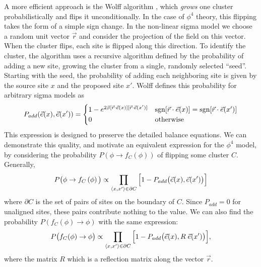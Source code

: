 A more efficient approach is the Wolff algorithm \cite{wolff1989}, which \textit{grows} one cluster probabilistically and flips it unconditionally. In the case of $\phi^4$ theory, this flipping takes the form of a simple sign change. In the non-linear sigma model we choose a random unit vector $\vec r$ and consider the projection of the field on this vector. When the cluster flips, each site is flipped along this direction. To identify the cluster, the algorithm uses a recursive algorithm defined by the probability of adding a new site, growing the cluster from a single, randomly selected ``seed''. Starting with the seed, the probability of adding each neighboring site is given by the source site $x$ and the proposed site $x'$. Wolff defines this probability for arbitrary sigma models as 
\begin{equation}
    \label{eq:phi4 wolff padd}
    P_{add}(\vec e(x),\vec e(x')) = \begin{cases} 
        1 - e^{2\beta [\vec{r} \cdot \vec e(x)][\vec{r} \cdot \vec e(x')]} & \mathrm{sgn}[\vec{r}\cdot\vec e(x)]=\mathrm{sgn}[\vec{r}\cdot\vec e(x')]\\
        0 & \mathrm{otherwise} \\
   \end{cases}
\end{equation}
This expression is designed to preserve the detailed balance equations. We can demonstrate this quality, and motivate an equivalent expression for the $\phi^4$ model, by considering the probability $P(\phi\rightarrow f_C(\phi))$ of flipping some cluster $C$. Generally,
\begin{equation}
    P\big(\phi \rightarrow f_C\left(\phi\right)\big) \propto \prod_{\langle x,x'\rangle \in \partial C}  \Big[1 - P_{add}\big(\vec e(x),\vec e(x')\big)\Big]
\end{equation}
where $\partial C$ is the set of pairs of sites on the boundary of $C$. Since $P_{add}=0$ for unaligned sites, these pairs contribute nothing to the value. We can also find the probability $P(f_C(\phi) \rightarrow \phi)$ with the same expression:
\begin{equation}
P\big(f_C(\phi)\rightarrow \phi \big) \propto \prod_{\langle x,x'\rangle \in \partial C}  \Big[1 - P_{add}\big(\vec e(x),R\;\vec e(x')\big)\Big],
\end{equation}
where the matrix $R$ which is a reflection matrix along the vector $\vec{r}$.

